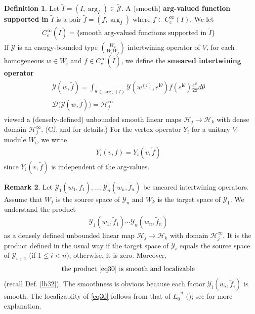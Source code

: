 \documentclass[11pt,b5paper,notitlepage]{article}
\theoremstyle{definition}
\newtheorem{df}{Definition}[section]
\newtheorem{rem}[df]{Remark}
\theoremstyle{plain}
\newcommand{\mc}{\mathcal}
\newcommand{\wtd}{\widetilde}
\newcommand{\ovl}{\overline}
\newcommand{\Dom}{\scr D}
\newcommand{\scr}{\mathscr}
\newcommand{\Jtd}{\widetilde{\mathcal J}}
\newcommand{\im}{\mathbf{i}}
\numberwithin{equation}{section}
\begin{document}
\begin{df}
Let $\wtd I=(I,\arg_I)\in\Jtd$. A (smooth) \textbf{arg-valued function supported in $\wtd I$} is a pair $\wtd f=(f,\arg_I)$ where $f\in C_c^\infty(I)$. We let
\begin{align*}
C_c^\infty(\wtd I)=\{\text{smooth arg-valued functions supported in }\wtd I\}
\end{align*}
If $\mc Y$ is an energy-bounded type $W_k\choose W_iW_j$ intertwining operator of $V$, for each homogeneous $w\in W_i$ and $\wtd f\in C_c^\infty(\wtd I)$, we define the \textbf{smeared intertwining operator}
\begin{gather}
\begin{gathered}
\mc Y(w,\wtd f)=\int_{\theta\in\arg_I(I)}\mc Y(w^{(i)},e^{\im\theta})f(e^{\im\theta})\frac{e^{\im\theta}}{2\pi}d\theta\\
\Dom\big(\mc Y(w,\wtd f)\big)=\mc H_j^\infty
\end{gathered}
\end{gather}  
viewed a (densely-defined) unbounded smooth linear maps $\mc H_j\rightarrow\mc H_k$ with dense domain $\mc H_j^\infty$. (Cf. \cite[Sec. 4.4]{Gui21a} and \cite[Ch. 3]{Gui19a} for details.) For the vertex operator $Y_i$ for a unitary $V$-module $W_i$, we write
\begin{align*}
Y_i(v,f)=Y_i(v,\wtd f)
\end{align*}
since $Y_i(v,\wtd f)$ is independent of the arg-values.
\end{df}

\begin{rem}\label{lb54}
Let $\mc Y_1(w_1,\wtd f_1),\dots,\mc Y_n(w_n,\wtd f_n)$ be smeared intertwining operators. Assume that $W_j$ is the source space of $\mc Y_n$ and $W_k$ is the target space of $\mc Y_1$. We understand the product
\begin{align}
\mc Y_1(w_1,\wtd f_1)\cdots\mc Y_n(w_n,\wtd f_n)\label{eq30}
\end{align}
as a densely defined unbounded linear map $\mc H_j\rightarrow\mc H_k$ with domain $\mc H_j^\infty$. It is the product defined in the usual way if the target space of $\mc Y_i$ equals the source space of $\mc Y_{i+1}$ (if $1\leq i<n$); otherwise, it is zero. Moreover,
\begin{align*}
\text{the product \eqref{eq30} is smooth and localizable}
\end{align*}
(recall Def. \ref{lb32}). The smoothness is obvious because each factor $\mc Y_i(w_i,\wtd f_i)$ is smooth. The localizablity of \eqref{eq30} follows from that of $\ovl {L_0}^n$ (\cite[Lem. 7.2]{CKLW18}); see \cite[Prop. 2.1.2]{Gui20} for more explanation.   
\end{rem}
\end{document}
